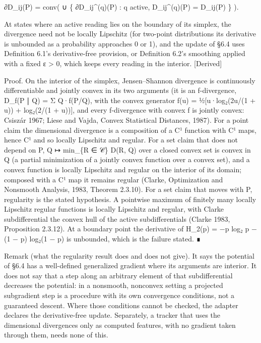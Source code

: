 \documentclass[
]{article}
\begin{document}
∂D\_ij(P) = conv( ∪ \{ ∂D\_ij\^{}(q)(P) : q active, D\_ij\^{}(q)(P) =
D\_ij(P) \} ).

At states where an active reading lies on the boundary of its simplex,
the divergence need not be locally Lipschitz (for two-point
distributions its derivative is unbounded as a probability approaches 0
or 1), and the update of §6.4 uses Definition 6.1's derivative-free
provision, or Definition 6.2's smoothing applied with a fixed ε
\textgreater{} 0, which keeps every reading in the interior.
{[}Derived{]}

Proof. On the interior of the simplex, Jensen--Shannon divergence is
continuously differentiable and jointly convex in its two arguments (it
is an f-divergence, D\_f(P ‖ Q) = Σ Q·f(P/Q), with the convex generator
f(u) = ½{[}u·log₂(2u/(1 + u)) + log₂(2/(1 + u)){]}, and every
f-divergence with convex f is jointly convex: Csiszár 1967; Liese and
Vajda, Convex Statistical Distances, 1987). For a point claim the
dimensional divergence is a composition of a C¹ function with C¹ maps,
hence C¹ and so locally Lipschitz and regular. For a set claim that does
not depend on P, Q ↦ min\_\{R ∈ 𝒞\} D(R, Q) over a closed convex set is
convex in Q (a partial minimization of a jointly convex function over a
convex set), and a convex function is locally Lipschitz and regular on
the interior of its domain; composed with a C¹ map it remains regular
(Clarke, Optimization and Nonsmooth Analysis, 1983, Theorem 2.3.10). For
a set claim that moves with P, regularity is the stated hypothesis. A
pointwise maximum of finitely many locally Lipschitz regular functions
is locally Lipschitz and regular, with Clarke subdifferential the convex
hull of the active subdifferentials (Clarke 1983, Proposition 2.3.12).
At a boundary point the derivative of H\_2(p) = −p log₂ p − (1 − p)
log₂(1 − p) is unbounded, which is the failure stated. ∎

Remark (what the regularity result does and does not give). It says the
potential of §6.4 has a well-defined generalized gradient where its
arguments are interior. It does not say that a step along an arbitrary
element of that subdifferential decreases the potential: in a nonsmooth,
nonconvex setting a projected subgradient step is a procedure with its
own convergence conditions, not a guaranteed descent. Where those
conditions cannot be checked, the adapter declares the derivative-free
update. Separately, a tracker that uses the dimensional divergences only
as computed features, with no gradient taken through them, needs none of
this.
\end{document}
